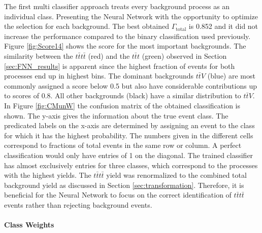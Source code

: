 The first multi classifier approach treats every background process as an individual class. Presenting the Neural Network with the opportunity to optimize the selection for each background. The best obtained $\Gamma_{\text{total}}$ is 0.852 and it did not increase the performance compared to the binary classification used previously. \\
Figure \ref{fig:Score14} shows the score for the most important backgrounds. The similarity between the $t\bar{t}t\bar{t}$ (red) and the $t\bar{t}t$ (green) observed in Section \ref{sec:FNN_results} is apparent since the highest fraction of events for both processes end up in highest bins. The dominant backgrounds $t\bar{t}V$ (blue) are most commonly assigned a score below 0.5 but also have considerable contributions up to scores of 0.8. All other backgrounds (black) have a similar distribution to $t\bar{t}V$. \\
In Figure \ref{fig:CMunW} the confusion matrix of the obtained classification is shown. The y-axis gives the information about the true event class. The predicated labels on the x-axis are determined by assigning an event to the class for which it has the highest probability. The numbers given in the different cells correspond to fractions of total events in the same row or column. A perfect classification would only have entries of 1 on the diagonal. The trained classifier has almost exclusively entries for three classes, which correspond to the processes with the highest yields. The $t\bar{t}t\bar{t}$ yield was renormalized to the combined total background yield as discussed in Section \ref{sec:transformation}. Therefore, it is beneficial for the Neural Network to focus on the correct identification of  $t\bar{t}t\bar{t}$ events rather than rejecting background events.

\newpage

\paragraph{Class Weights} \mbox{} \\

